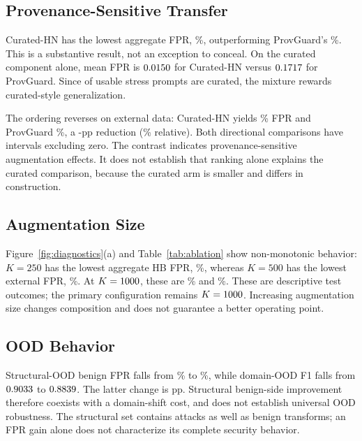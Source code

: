 \documentclass[conference]{IEEEtran}
\begin{document}
\subsection{Provenance-Sensitive Transfer}
Curated-HN has the lowest aggregate FPR, \CurHBPct\%, outperforming ProvGuard's \PGHBPct\%. This is a substantive result, not an exception to conceal. On the curated component alone, mean FPR is $0.0150$ for Curated-HN versus $0.1717$ for ProvGuard. Since \NCuratedHB{} of \NHB{} usable stress prompts are curated, the mixture rewards curated-style generalization.

The ordering reverses on external data: Curated-HN yields \CurExtPct\% FPR and ProvGuard \PGExtPct\%, a \CurExtDropPP{}-pp reduction (\CurExtDropRel\% relative). Both directional comparisons have intervals excluding zero. The contrast indicates provenance-sensitive augmentation effects. It does not establish that ranking alone explains the curated comparison, because the curated arm is smaller and differs in construction.

\subsection{Augmentation Size}
Figure~\ref{fig:diagnostics}(a) and Table~\ref{tab:ablation} show non-monotonic behavior: $K=250$ has the lowest aggregate HB FPR, \KSmallHBPct\%, whereas $K=500$ has the lowest external FPR, \KMediumExtPct\%. At $K=\PrimaryK$, these are \PGHBPct\% and \PGExtPct\%. These are descriptive test outcomes; the primary configuration remains $K=\PrimaryK$. Increasing augmentation size changes composition and does not guarantee a better operating point.

\subsection{OOD Behavior}
Structural-OOD benign FPR falls from \BaseStructPct\% to \PGStructPct\%, while domain-OOD F1 falls from $0.9033$ to $0.8839$. The latter change is \BaseDomChangePP{} pp. Structural benign-side improvement therefore coexists with a domain-shift cost, and does not establish universal OOD robustness. The structural set contains attacks as well as benign transforms; an FPR gain alone does not characterize its complete security behavior.

\begin{table}[t]
\caption{Nested augmentation-size ablation: five-seed mean $\pm$ sample SD. $K=\PrimaryK$ remains primary; no size is selected retrospectively from evaluation FPR. All rates are on the $0$--$1$ scale.}
\label{tab:ablation}
\centering\footnotesize
\setlength{\tabcolsep}{5pt}
\renewcommand{\arraystretch}{1.14}

\end{table}
\end{document}
